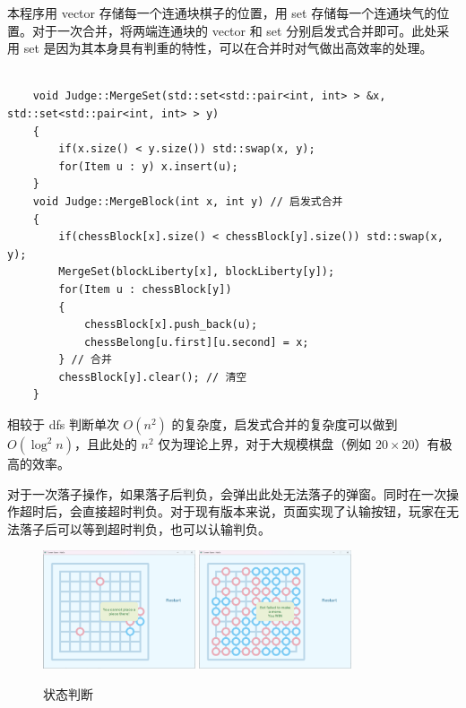 \documentclass{noithesis}
\begin{document}
	本程序用 vector 存储每一个连通块棋子的位置，用 set 存储每一个连通块气的位置。对于一次合并，将两端连通块的 vector 和 set 分别启发式合并即可。此处采用 set 是因为其本身具有判重的特性，可以在合并时对气做出高效率的处理。
	
	\begin{lstlisting}
		
	void Judge::MergeSet(std::set<std::pair<int, int> > &x, std::set<std::pair<int, int> > y)
	{
		if(x.size() < y.size()) std::swap(x, y);
		for(Item u : y) x.insert(u);
	}
	void Judge::MergeBlock(int x, int y) // 启发式合并
	{
		if(chessBlock[x].size() < chessBlock[y].size()) std::swap(x, y);
		MergeSet(blockLiberty[x], blockLiberty[y]);
		for(Item u : chessBlock[y])
		{
			chessBlock[x].push_back(u);
			chessBelong[u.first][u.second] = x;
		} // 合并
		chessBlock[y].clear(); // 清空
	}
	\end{lstlisting}

	相较于 dfs 判断单次 $O\left(n^2\right)$ 的复杂度，启发式合并的复杂度可以做到 $O\left(\log^2 n\right)$，且此处的 $n^2$ 仅为理论上界，对于大规模棋盘（例如 $20\times 20$）有极高的效率。
	
	对于一次落子操作，如果落子后判负，会弹出此处无法落子的弹窗。同时在一次操作超时后，会直接超时判负。对于现有版本来说，页面实现了认输按钮，玩家在无法落子后可以等到超时判负，也可以认输判负。
	
	\begin{figure}[!htb]{
			\centering
			\includegraphics[width=0.4\textwidth]{img/tip.png}
			\includegraphics[width=0.4\textwidth]{img/win.png}
			\caption{状态判断}
		}
	\end{figure}
	
\end{document}
